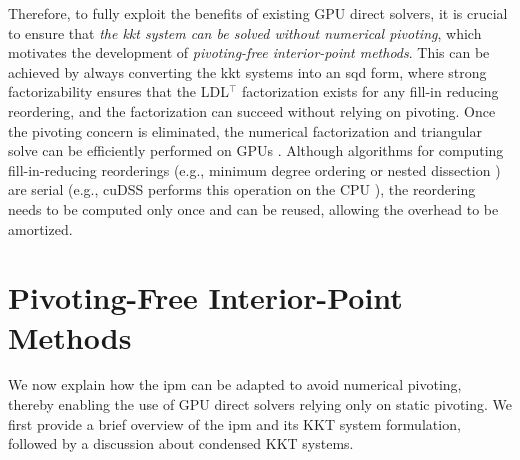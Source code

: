 \documentclass{article}
\begin{document}
Therefore, to fully exploit the benefits of existing GPU direct solvers, it is crucial to ensure that \emph{the \gls*{kkt} system can be solved without numerical pivoting}, which motivates the development of \emph{pivoting-free interior-point methods}.
This can be achieved by always converting the \gls*{kkt} systems into an \gls*{sqd} form, where strong factorizability ensures that the LDL$^\top$ factorization exists for any fill-in reducing reordering, and the factorization can succeed without relying on pivoting.
Once the pivoting concern is eliminated, the numerical factorization and triangular solve can be efficiently performed on GPUs \cite{naumovParallelSolutionSparse}. 
Although algorithms for computing fill-in-reducing reorderings (e.g., minimum degree ordering \cite{amestoyApproximateMinimumDegree1996} or nested dissection \cite{karypisMETISSoftwarePackage1997}) are serial (e.g., cuDSS performs this operation on the CPU \cite{nvidiaNVIDIACuDSSPreview}), the reordering needs to be computed only once and can be reused, allowing the overhead to be amortized.


\section{Pivoting-Free Interior-Point Methods}\label{eqn:ipm}
We now explain how the \gls*{ipm} can be adapted to avoid numerical pivoting, thereby enabling the use of GPU direct solvers relying only on static pivoting. We first provide a brief overview of the \gls*{ipm} and its KKT system formulation, followed by a discussion about condensed KKT systems.
\end{document}
